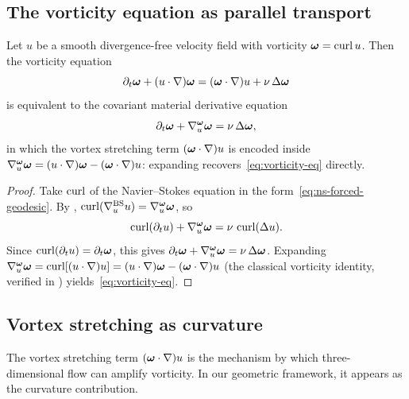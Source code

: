 \subsection{The vorticity equation as parallel transport}

\begin{theorem}\label{thm:vorticity-eq}
  Let $u$ be a smooth divergence-free velocity field with vorticity
  $\boldsymbol{\omega} = \operatorname{curl} u$.  Then the vorticity equation
  \begin{equation}\label{eq:vorticity-eq}
    \partial_t\boldsymbol{\omega} + (u \cdot \nabla)\boldsymbol{\omega} = (\boldsymbol{\omega} \cdot \nabla)u + \nu\,\Delta\boldsymbol{\omega}
  \end{equation}
  is equivalent to the covariant material derivative equation
  \begin{equation}\label{eq:vort-parallel}
    \partial_t\boldsymbol{\omega} + \nabla^{\boldsymbol{\omega}}_u \boldsymbol{\omega} = \nu\,\Delta\boldsymbol{\omega},
  \end{equation}
  in which the vortex stretching term $(\boldsymbol{\omega} \cdot \nabla)u$ is encoded inside
  $\nabla^{\boldsymbol{\omega}}_u\boldsymbol{\omega} = (u\cdot\nabla)\boldsymbol{\omega} - (\boldsymbol{\omega}\cdot\nabla)u$: expanding
  recovers~\eqref{eq:vorticity-eq} directly.
\end{theorem}

\begin{proof}
  Take $\operatorname{curl}$ of the Navier--Stokes equation in the form~\eqref{eq:ns-forced-geodesic}.
  By , $\operatorname{curl}(\nabla^{\mathrm{BS}}_u u) = \nabla^{\boldsymbol{\omega}}_u\boldsymbol{\omega}$, so
  \[
    \operatorname{curl}(\partial_t u) + \nabla^{\boldsymbol{\omega}}_u \boldsymbol{\omega} = \nu\,\operatorname{curl}(\Delta u).
  \]
  Since $\operatorname{curl}(\partial_t u) = \partial_t\boldsymbol{\omega}$, this gives
  $\partial_t\boldsymbol{\omega} + \nabla^{\boldsymbol{\omega}}_u\boldsymbol{\omega} = \nu\,\Delta\boldsymbol{\omega}$.
  Expanding $\nabla^{\boldsymbol{\omega}}_u\boldsymbol{\omega} = \operatorname{curl}[(u\cdot\nabla)u]
  = (u \cdot \nabla)\boldsymbol{\omega} - (\boldsymbol{\omega} \cdot \nabla)u$
  (the classical vorticity identity, verified in )
  yields~\eqref{eq:vorticity-eq}.
\end{proof}

\subsection{Vortex stretching as curvature}

The vortex stretching term $(\boldsymbol{\omega} \cdot \nabla)u$ is the mechanism by which
three-dimensional flow can amplify vorticity.  In our geometric framework, it appears
as the curvature contribution.

